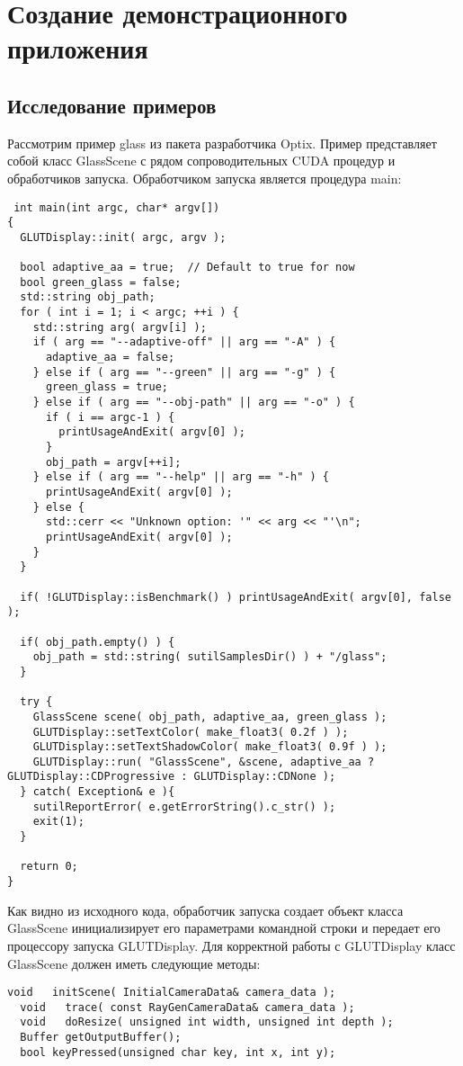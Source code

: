\section{Создание демонстрационного приложения}
\subsection{Исследование примеров}
 Рассмотрим пример glass из пакета разработчика Optix. 
 Пример представляет собой класс GlassScene с рядом сопроводительных CUDA процедур и обработчиков запуска.
 Обработчиком запуска является процедура main:
 \begin{verbatim}
 int main(int argc, char* argv[])
{
  GLUTDisplay::init( argc, argv );

  bool adaptive_aa = true;  // Default to true for now
  bool green_glass = false;
  std::string obj_path;
  for ( int i = 1; i < argc; ++i ) {
    std::string arg( argv[i] );
    if ( arg == "--adaptive-off" || arg == "-A" ) {
      adaptive_aa = false;
    } else if ( arg == "--green" || arg == "-g" ) {
      green_glass = true;
    } else if ( arg == "--obj-path" || arg == "-o" ) {
      if ( i == argc-1 ) {
        printUsageAndExit( argv[0] );
      }
      obj_path = argv[++i];
    } else if ( arg == "--help" || arg == "-h" ) {
      printUsageAndExit( argv[0] );
    } else {
      std::cerr << "Unknown option: '" << arg << "'\n";
      printUsageAndExit( argv[0] );
    }
  }

  if( !GLUTDisplay::isBenchmark() ) printUsageAndExit( argv[0], false );

  if( obj_path.empty() ) {
    obj_path = std::string( sutilSamplesDir() ) + "/glass";
  }

  try {
    GlassScene scene( obj_path, adaptive_aa, green_glass );
    GLUTDisplay::setTextColor( make_float3( 0.2f ) );
    GLUTDisplay::setTextShadowColor( make_float3( 0.9f ) );
    GLUTDisplay::run( "GlassScene", &scene, adaptive_aa ? GLUTDisplay::CDProgressive : GLUTDisplay::CDNone );
  } catch( Exception& e ){
    sutilReportError( e.getErrorString().c_str() );
    exit(1);
  }

  return 0;
}
\end{verbatim}
Как  видно из исходного кода,  обработчик запуска создает объект класса GlassScene инициализирует его параметрами командной строки и передает его процессору запуска GLUTDisplay. Для корректной работы с GLUTDisplay класс GlassScene должен иметь следующие методы:
\begin{verbatim}
void   initScene( InitialCameraData& camera_data );
  void   trace( const RayGenCameraData& camera_data );
  void   doResize( unsigned int width, unsigned int depth );
  Buffer getOutputBuffer();
  bool keyPressed(unsigned char key, int x, int y);
\end{verbatim}
